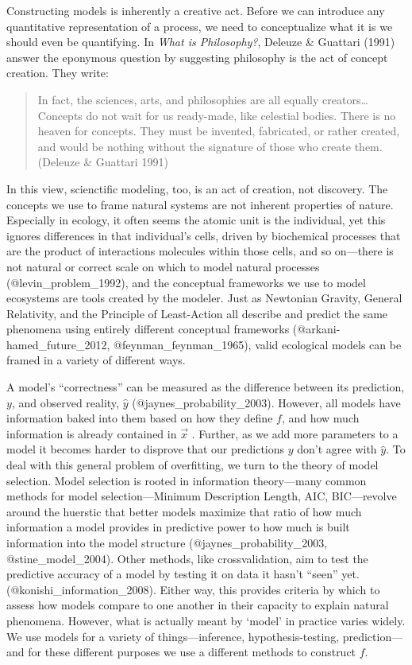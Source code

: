 Constructing models is inherently a creative act. Before we can
introduce any quantitative representation of a process, we need to
conceptualize what it is we should even be quantifying. In \emph{What is
Philosophy?}, Deleuze \& Guattari (1991) answer the eponymous question
by suggesting philosophy is the act of concept creation. They write:

\begin{quote}
In fact, the sciences, arts, and philosophies are all equally
creators\ldots{} Concepts do not wait for us ready-made, like celestial
bodies. There is no heaven for concepts. They must be invented,
fabricated, or rather created, and would be nothing without the
signature of those who create them. (Deleuze \& Guattari 1991)
\end{quote}

In this view, scienctific modeling, too, is an act of creation, not
discovery. The concepts we use to frame natural systems are not inherent
properties of nature. Especially in ecology, it often seems the atomic
unit is the individual, yet this ignores differences in that
individual's cells, driven by biochemical processes that are the product
of interactions molecules within those cells, and so on---there is not
natural or correct scale on which to model natural processes
(@levin\_problem\_1992), and the conceptual frameworks we use to model
ecosystems are tools created by the modeler. Just as Newtonian Gravity,
General Relativity, and the Principle of Least-Action all describe and
predict the same phenomena using entirely different conceptual
frameworks (@arkani-hamed\_future\_2012, @feynman\_feynman\_1965), valid
ecological models can be framed in a variety of different ways.

A model's ``correctness'' can be measured as the difference between its
prediction, \(y\), and observed reality, \(\hat{y}\)
(@jaynes\_probability\_2003). However, all models have information baked
into them based on how they define \(f\), and how much information is
already contained in \(\vec{x}\) . Further, as we add more parameters to
a model it becomes harder to disprove that our predictions \(y\) don't
agree with \(\hat{y}\). To deal with this general problem of
overfitting, we turn to the theory of model selection. Model selection
is rooted in information theory---many common methods for model
selection---Minimum Description Length, AIC, BIC---revolve around the
huerstic that better models maximize that ratio of how much information
a model provides in predictive power to how much is built information
into the model structure (@jaynes\_probability\_2003,
@stine\_model\_2004). Other methods, like crossvalidation, aim to test
the predictive accuracy of a model by testing it on data it hasn't
``seen'' yet. (@konishi\_information\_2008). Either way, this provides
criteria by which to assess how models compare to one another in their
capacity to explain natural phenomena. However, what is actually meant
by `model' in practice varies widely. We use models for a variety of
things---inference, hypothesis-testing, prediction---and for these
different purposes we use a different methods to construct \(f\).

